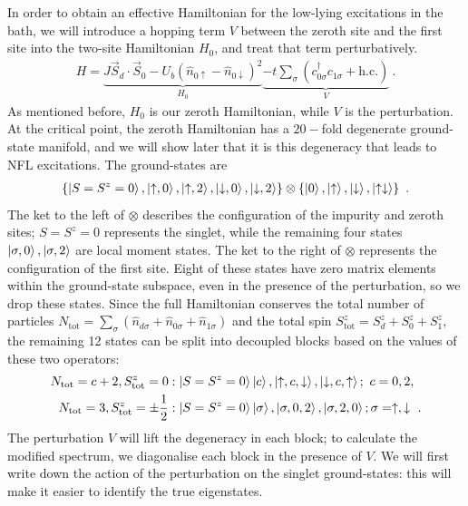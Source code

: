 In order to obtain an effective Hamiltonian for the low-lying excitations in the bath, we will introduce a hopping term \(V\) between the zeroth site and the first site into the two-site Hamiltonian \(H_0\), and treat that term perturbatively. 
\begin{eqnarray}
	H = \underbrace{J \vec{S}_d\cdot\vec{S}_0 - U_b \left( \hat n_{0 \uparrow} - \hat n_{0 \downarrow} \right)^2 }_{H_0} \underbrace{- t\sum_\sigma\left( c^\dagger_{0\sigma}c_{1\sigma} + \text{h.c.}\right)}_V~.
\end{eqnarray}
As mentioned before, \(H_0\) is our zeroth Hamiltonian, while \(V\) is the perturbation. At the critical point, the zeroth Hamiltonian has a \(20-\)fold degenerate ground-state manifold, and we will show later that it is this degeneracy that leads to NFL excitations. The ground-states are
\begin{eqnarray}
	\left\{\ket{S=S^z=0}, \ket{\uparrow, 0}, \ket{\uparrow, 2}, \ket{\downarrow, 0}, \ket{\downarrow, 2}\right\}\otimes\left\{\ket{0},\ket{\uparrow},\ket{\downarrow},\ket{\uparrow \downarrow}\right\}~.
\end{eqnarray}
The ket to the left of \(\otimes\) describes the configuration of the impurity and zeroth sites; \(S=S^z=0\) represents the singlet, while the remaining four states \(\ket{\sigma, 0},\ket{\sigma,2}\) are local moment states. The ket to the right of \(\otimes\) represents the configuration of the first site. Eight of these states have zero matrix elements within the ground-state subspace, even in the presence of the perturbation, so we drop these states. Since the full Hamiltonian conserves the total number of particles \(N_\text{tot} = \sum_\sigma\left(\hat n_{d\sigma} + \hat n_{0\sigma} + \hat n_{1\sigma}\right)\) and the total spin \(S_\text{tot}^z = S_d^z + S_0^z + S_1^z\), the remaining 12 states can be split into decoupled blocks based on the values of these two operators:
\begin{eqnarray}
	N_\text{tot} = c+2, S_\text{tot}^z = 0&: \ket{S=S^z=0}\ket{c}, \ket{\uparrow, c, \downarrow}, \ket{\downarrow, c, \uparrow}; ~c=0,2, \nonumber\\
	N_\text{tot} = 3, S_\text{tot}^z = \pm\frac{1}{2}&: \ket{S=S^z=0}\ket{\sigma}, \ket{\sigma, 0, 2}, \ket{\sigma, 2, 0};\sigma=\uparrow,\downarrow~.
\end{eqnarray}
The perturbation \(V\) will lift the degeneracy in each block; to calculate the modified spectrum, we diagonalise each block in the presence of \(V\). We will first write down the action of the perturbation on the singlet ground-states: this will make it easier to identify the true eigenstates.

